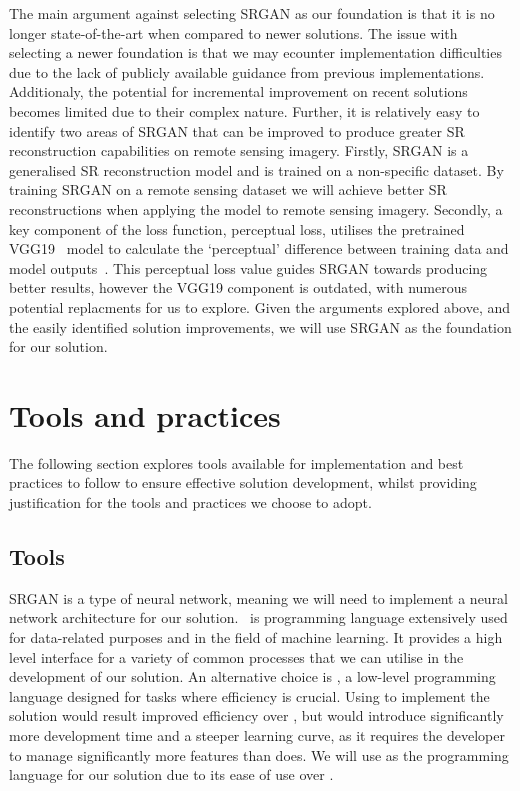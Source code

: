 The main argument against selecting SRGAN as our foundation is that it is no longer state-of-the-art when compared to newer solutions. The issue with selecting a newer foundation is that we may ecounter implementation difficulties due to the lack of publicly available guidance from previous implementations. Additionaly, the potential for incremental improvement on recent solutions becomes limited due to their complex nature. Further, it is relatively easy to identify two areas of SRGAN that can be improved to produce greater SR reconstruction capabilities on remote sensing imagery. Firstly, SRGAN is a generalised SR reconstruction model and is trained on a non-specific dataset. By training SRGAN on a remote sensing dataset we will achieve better SR reconstructions when applying the model to remote sensing imagery. Secondly, a key component of the loss function, perceptual loss, utilises the pretrained VGG19~\cite{vgg19} model to calculate the `perceptual' difference between training data and model outputs~\cite{srgan}. This perceptual loss value guides SRGAN towards producing better results, however the VGG19 component is outdated, with numerous potential replacments for us to explore. Given the arguments explored above, and the easily identified solution improvements, we will use SRGAN as the foundation for our solution.

\section{Tools and practices}
The following section explores tools available for implementation and best practices to follow to ensure effective solution development, whilst providing justification for the tools and practices we choose to adopt.

\subsection{Tools}
SRGAN is a type of neural network, meaning we will need to implement a neural network architecture for our solution.\  is programming language extensively used for data-related purposes and in the field of machine learning. It provides a high level interface for a variety of common processes that we can utilise in the development of our solution. An alternative choice is , a low-level programming language designed for tasks where efficiency is crucial. Using  to implement the solution would result improved efficiency over , but would introduce significantly more development time and a steeper learning curve, as it requires the developer to manage significantly more features than  does. We will use  as the programming language for our solution due to its ease of use over .

